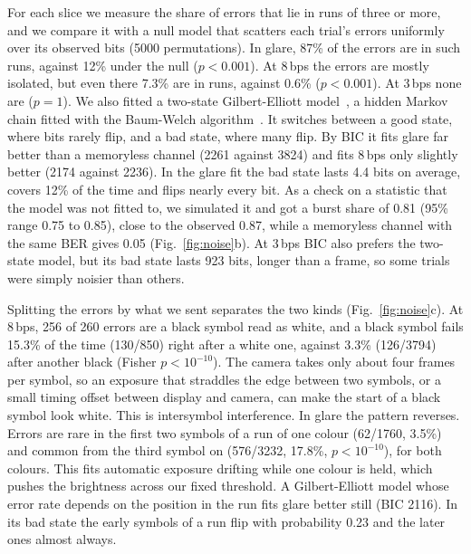 \documentclass[conference,a4paper]{IEEEtran}
\begin{document}
For each slice we measure the share of errors that lie in runs of
three or more, and we compare it with a null model that scatters each trial's errors uniformly over
its observed bits (5000 permutations). In glare, 87\% of the errors are in such runs, against 12\%
under the null ($p<0.001$). At 8\,bps the errors are mostly isolated, but even there 7.3\% are in
runs, against 0.6\% ($p<0.001$). At 3\,bps none are ($p=1$). We also fitted a two-state
Gilbert-Elliott model~\cite{gilbert,elliott}, a hidden Markov chain fitted with the Baum-Welch
algorithm~\cite{rabiner}. It switches between a good state, where bits rarely flip, and a bad
state, where many flip. By BIC it fits glare far better than a memoryless channel (2261 against
3824) and fits 8\,bps only slightly better (2174 against 2236). In the glare fit the bad state
lasts 4.4 bits on average, covers 12\% of the time and flips nearly every bit. As a check on a
statistic that the model was not fitted to, we simulated it and got a burst share of 0.81 (95\%
range 0.75 to 0.85), close to the observed 0.87, while a memoryless channel with the same BER gives
0.05 (Fig.~\ref{fig:noise}b). At 3\,bps BIC also prefers the two-state model, but its bad state
lasts 923 bits, longer than a frame, so some trials were simply noisier than others.

Splitting the errors by what we sent separates the two kinds
(Fig.~\ref{fig:noise}c). At 8\,bps, 256 of 260 errors are a black symbol read as white, and a black
symbol fails 15.3\% of the time (130/850) right after a white one, against 3.3\% (126/3794) after
another black (Fisher $p<10^{-10}$). The camera takes only about four frames per symbol, so an
exposure that straddles the edge between two symbols, or a small timing offset between display and
camera, can make the start of a black symbol look white. This is intersymbol interference. In glare
the pattern reverses. Errors are rare in the first two symbols of a run of one colour (62/1760,
3.5\%) and common from the third symbol on (576/3232, 17.8\%, $p<10^{-10}$), for both colours. This
fits automatic exposure drifting while one colour is held, which pushes the brightness across our
fixed threshold. A Gilbert-Elliott model whose error rate depends on the position in the run fits
glare better still (BIC 2116). In its bad state the early symbols of a run flip with probability
0.23 and the later ones almost always.
\end{document}
